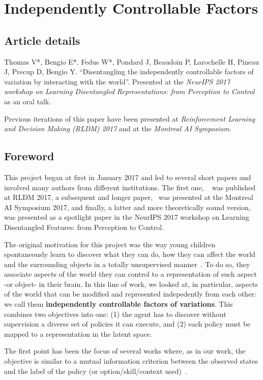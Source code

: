 \chapter{Independently Controllable Factors}
\label{chapter:icf}
\section*{Article details}
Thomas V*, Bengio E*, Fedus W*, Pondard J, Beaudoin P, Larochelle H, Pineau J, Precup D, Bengio Y. ``Disentangling the independently controllable factors of variation by interacting with the world''. Presented at the \emph{ NeurIPS 2017 workshop on Learning Disentangled Representations: from Perception to Control} as an oral talk. 

Previous iterations of this paper have been presented at \emph{Reinforcement Learning and Decision Making (RLDM) 2017} and at the \emph{Montreal AI Symposium}.

\section*{Foreword}
This project began at first in January 2017 and led to several short papers and involved many authors from different institutions. The first one, ~\citet{bengio2017independently} was published at RLDM 2017, a subsequent and longer paper,~\citet{thomas2017independently} was presented at the Montreal AI Symposium 2017, and finally, a latter and more theoretically sound version, \citet{thomas2018disentangling} was presented as a spotlight paper in the NeurIPS 2017 workshop on Learning Disentangled Features: from Perception to Control.

The original motivation for this project was the way young children spontaneously learn to discover what they can do, how they can affect the world and the surrounding objects in a totally unsupervised manner~\citep{berlyne1966curiosity, gopnik1999scientist}. To do so, they associate aspects of the world they can control to a representation of such aspect -or object- in their brain. In this line of work, we looked at, in particular, aspects of the world that can be modified and represented indepedently from each other: we call them \textbf{independently controllable factors of variations}. This combines two objectives into one: (1) the agent has to discover without supervision a diverse set of policies it can execute, and (2) each policy must be mapped to a representation in the latent space.

The first point has been the focus of several works where, as in our work, the objective is similar to a mutual information criterion between the observed states and the label of the policy (or option/skill/context used)~\citep{still2012information, mohamed2015variational, gregor2016variational, florensa2017stochastic, eysenbach2018diversity, achiam2018variational}.

